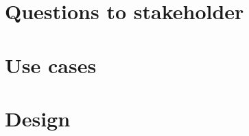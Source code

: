 \documentclass[a4paper,11pt]{article}
\begin{document}
	
	
	\tableofcontents
	\newpage
	
	\section{Questions to stakeholder}
	
	\newpage
	
	\section{Use cases}
	
	\newpage

	\section{Design}
	
	\newpage
\end{document}
